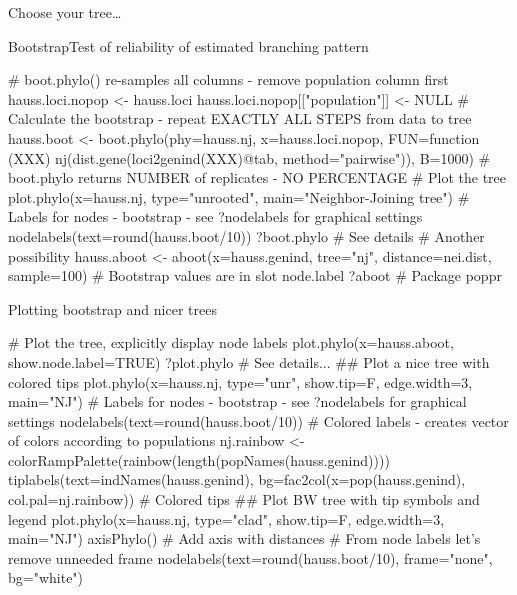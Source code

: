 \documentclass[compress, xelatex, 11pt, xcolor=svgnames, aspectratio=169,
	hyperref={
		bookmarks=true,
		unicode=true,
		colorlinks=true,
		pdftitle={Molecular data in R},
		plainpages=false,
		pdfauthor={Vojtech Zeisek},
		pdfsubject={Course about phylogeny and evolution in R},
		pdfcreator={XeLaTeX},
		pdfkeywords={R, evolution, phylogeny, molecular data},
		linkcolor=Crimson, %
		anchorcolor=Magenta, %
		citecolor=Magenta, %
		filecolor=Magenta, %
		menucolor=Magenta, %
		urlcolor=DodgerBlue, %
		},
	url={hyphens, lowtilde} %
	]{beamer}
\renewcommand{\texttt}[1]{\colorbox{Beige}{{\ttfamily #1}}}
\begin{document}
\begin{frame}{Choose your tree\ldots}
	\begin{center}
		\texttt{[image: nj1.png]}
	\end{center}
\end{frame}

\begin{frame}[fragile]{Bootstrap}{Test of reliability of estimated branching pattern}
	\begin{spluscode}
    # boot.phylo() re-samples all columns - remove population column first
    hauss.loci.nopop <- hauss.loci
    hauss.loci.nopop[["population"]] <- NULL
    # Calculate the bootstrap - repeat EXACTLY ALL STEPS from data to tree
    hauss.boot <- boot.phylo(phy=hauss.nj, x=hauss.loci.nopop, FUN=function
      (XXX) nj(dist.gene(loci2genind(XXX)@tab, method="pairwise")), B=1000)
    # boot.phylo returns NUMBER of replicates - NO PERCENTAGE
    # Plot the tree
    plot.phylo(x=hauss.nj, type="unrooted", main="Neighbor-Joining tree")
    # Labels for nodes - bootstrap - see ?nodelabels for graphical settings
    nodelabels(text=round(hauss.boot/10))
    ?boot.phylo # See details
    # Another possibility
    hauss.aboot <- aboot(x=hauss.genind, tree="nj", distance=nei.dist,
      sample=100) # Bootstrap values are in slot node.label
    ?aboot # Package poppr
	\end{spluscode}
\end{frame}

\begin{frame}[fragile]{Plotting bootstrap and nicer trees}
	\begin{spluscode}
    # Plot the tree, explicitly display node labels
    plot.phylo(x=hauss.aboot, show.node.label=TRUE)
    ?plot.phylo # See details...
    ## Plot a nice tree with colored tips
    plot.phylo(x=hauss.nj, type="unr", show.tip=F, edge.width=3, main="NJ")
    # Labels for nodes - bootstrap - see ?nodelabels for graphical settings
    nodelabels(text=round(hauss.boot/10))
    # Colored labels - creates vector of colors according to populations
    nj.rainbow <- colorRampPalette(rainbow(length(popNames(hauss.genind))))
    tiplabels(text=indNames(hauss.genind), bg=fac2col(x=pop(hauss.genind),
      col.pal=nj.rainbow)) # Colored tips
    ## Plot BW tree with tip symbols and legend
    plot.phylo(x=hauss.nj, type="clad", show.tip=F, edge.width=3, main="NJ")
    axisPhylo() # Add axis with distances
    # From node labels let's remove unneeded frame
    nodelabels(text=round(hauss.boot/10), frame="none", bg="white")
	\end{spluscode}
\end{frame}
\end{document}
